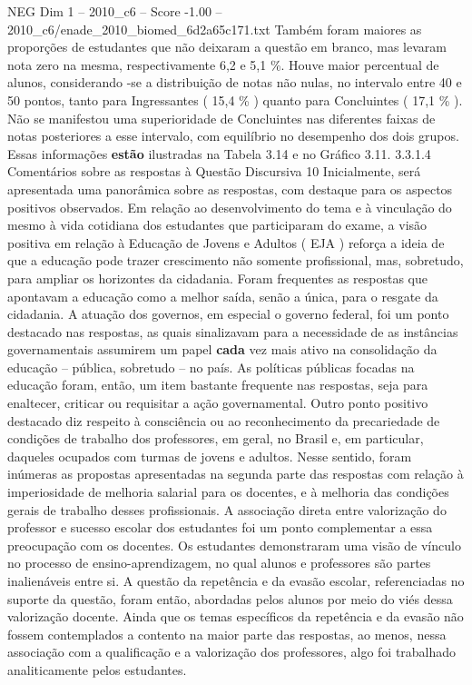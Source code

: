 \begin{textsample}{NEG Dim 1 – 2010\_c6 – Score -1.00 – 2010\_c6/enade\_2010\_biomed\_6d2a65c171.txt}
Também foram maiores as proporções de estudantes que não deixaram a questão em branco, mas levaram nota zero na mesma, respectivamente 6,2 e 5,1 \%.
Houve maior percentual de alunos, considerando -se a distribuição de notas não nulas, no intervalo entre 40 e 50 pontos, tanto para Ingressantes ( 15,4 \% ) quanto para Concluintes ( 17,1 \% ).
Não se manifestou uma superioridade de Concluintes nas diferentes faixas de notas posteriores a esse intervalo, com equilíbrio no desempenho dos dois grupos.
Essas informações \textbf{estão} ilustradas na Tabela 3.14 e no Gráfico 3.11. 3.3.1.4 Comentários sobre as respostas à Questão Discursiva 10 Inicialmente, será apresentada uma panorâmica sobre as respostas, com destaque para os aspectos positivos observados.
Em relação ao desenvolvimento do tema e à vinculação do mesmo à vida cotidiana dos estudantes que participaram do exame, a visão positiva em relação à Educação de Jovens e Adultos ( EJA ) reforça a ideia de que a educação pode trazer crescimento não somente profissional, mas, sobretudo, para ampliar os horizontes da cidadania.
Foram frequentes as respostas que apontavam a educação como a melhor saída, senão a única, para o resgate da cidadania.
A atuação dos governos, em especial o governo federal, foi um ponto destacado nas respostas, as quais sinalizavam para a necessidade de as instâncias governamentais assumirem um papel \textbf{cada} vez mais ativo na consolidação da educação – pública, sobretudo – no país.
As políticas públicas focadas na educação foram, então, um item bastante frequente nas respostas, seja para enaltecer, criticar ou requisitar a ação governamental.
Outro ponto positivo destacado diz respeito à consciência ou ao reconhecimento da precariedade de condições de trabalho dos professores, em geral, no Brasil e, em particular, daqueles ocupados com turmas de jovens e adultos.
Nesse sentido, foram inúmeras as propostas apresentadas na segunda parte das respostas com relação à imperiosidade de melhoria salarial para os docentes, e à melhoria das condições gerais de trabalho desses profissionais.
A associação direta entre valorização do professor e sucesso escolar dos estudantes foi um ponto complementar a essa preocupação com os docentes.
Os estudantes demonstraram uma visão de vínculo no processo de ensino-aprendizagem, no qual alunos e professores são partes inalienáveis entre si.
A questão da repetência e da evasão escolar, referenciadas no suporte da questão, foram então, abordadas pelos alunos por meio do viés dessa valorização docente.
Ainda que os temas específicos da repetência e da evasão não fossem contemplados a contento na maior parte das respostas, ao menos, nessa associação com a qualificação e a valorização dos professores, algo foi trabalhado analiticamente pelos estudantes.

\end{textsample}
